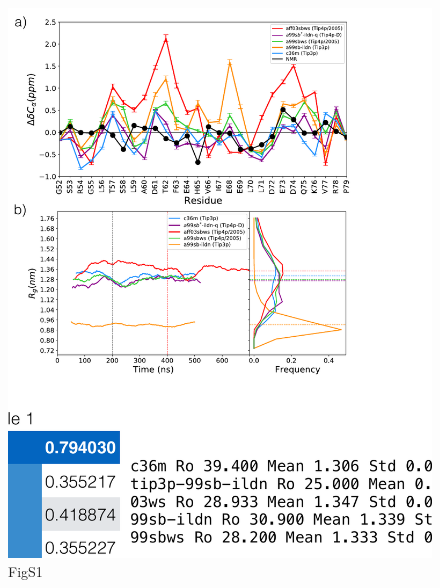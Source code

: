 \documentclass[10pt,letterpaper]{article}
\begin{document}
\begin{figure}[!ht]
\includegraphics[scale=0.5,width=\textwidth,trim={0 0cm 0 0cm},clip]{./figures/S1.pdf}
\caption{{FigS1}}
\end{figure}
\end{document}
